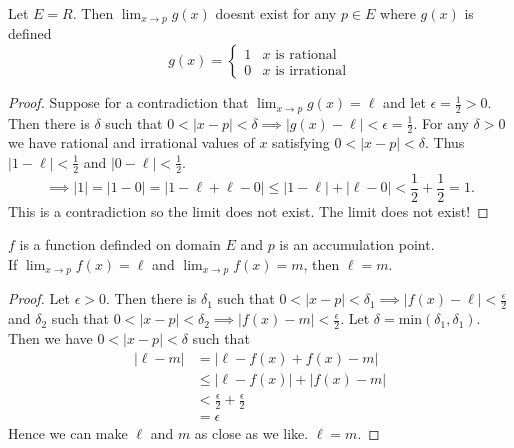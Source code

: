 \documentclass{article}
\begin{document}
\begin{exmp}
    Let \( E = R \). Then \( \lim_{x \to p} g(x) \) doesnt exist for any  \( p \in E \) 
    where \( g(x) \) is defined
    \[
        g(x) = \begin{cases} 
            1 & x \text{ is rational} \\
            0 & x \text{ is irrational}
        \end{cases}
    \] 
\end{exmp}

\begin{proof}
    Suppose for a contradiction that \( \lim_{x \to p} g(x) = \ell\) 
    and let \( \epsilon = \frac{1}{2} >0 \). Then there is \( \delta \) such that 
    \( 0 < |x-p| < \delta \implies |g(x) - \ell| < \epsilon = \frac{1}{2} \).
    For any \( \delta > 0\) we have rational and irrational values of \( x \) 
    satisfying \( 0 < |x - p| < \delta \). Thus \( |1 - \ell| < \frac{1}{2} \)
    and \( |0-\ell| < \frac{1}{2}  \).
    \[
        \implies | 1 | = |1 - 0| = |1 - \ell + \ell - 0| \le |1 - \ell| + |\ell - 0| < \frac{1}{2} + \frac{1}{2} = 1.
    \]
    This is a contradiction so the limit does not exist. The limit does not exist!
\end{proof}
\pagebreak
\begin{proposition}
    \(f\) is a function definded on domain \( E \) and \( p \) is an accumulation point.\\
    If \( \lim_{x \to p} f(x) = \ell \) and \( \lim_{x \to p} f(x) = m \), then  \( \ell = m \).
\end{proposition}
\begin{proof}
    Let \( \epsilon > 0 \). Then there is 
    \( \delta_1 \) such that  \( 0 < |x - p| < \delta_1 \implies |f(x) - \ell| <  \frac{\epsilon}{2}\)
    and \( \delta_2 \) such that  \( 0 < |x - p| < \delta_2 \implies |f(x) - m| <  \frac{\epsilon}{2}\).
    Let \( \delta = \text{min}(\delta_1, \delta_1) \). Then we have \( 0 < |x - p| < \delta \) such that
    \begin{align*}
        | \ell - m | &= | \ell - f(x) + f(x) - m| \\
                     &\le | \ell - f(x) | + | f(x) - m | \\
                     &< \frac{\epsilon}{2} + \frac{\epsilon}{2} \\
                     &= \epsilon
    \end{align*}
    Hence we can make  \( \ell \) and \( m \) as close as we like. \( \ell = m \).
\end{proof}
\end{document}
